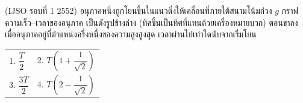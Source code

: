 (IJSO รอบที่ 1 2552) อนุภาคหนึ่งถูกโยนขึ้นในแนวดิ่งให้เคลื่อนที่ภายใต้สนามโน้มถ่วง $g$ กราฟความเร็ว--เวลาของอนุภาค เป็นดังรูปข้างล่าง (ทิศขึ้นเป็นทิศที่แทนด้วยเครื่องหมายบวก) ตอนขาลง เมื่ออนุภาคอยู่ที่ตำแหน่งครึ่งหนึ่งของความสูงสูงสุด เวลาผ่านไปเท่าใดนับจากเริ่มโยน
\begin{center}\end{center}
\par\smallskip\par\smallskip\begin{tabular}{@{}p{.48\linewidth}p{.48\linewidth}@{}}1. $\dfrac{T}{2}$ & 2. $T\left(1+\dfrac{1}{\sqrt{2}}\right)$ \\ 3. $\dfrac{3T}{2}$ & 4. $T\left(2-\dfrac{1}{\sqrt{2}}\right)$\end{tabular}
